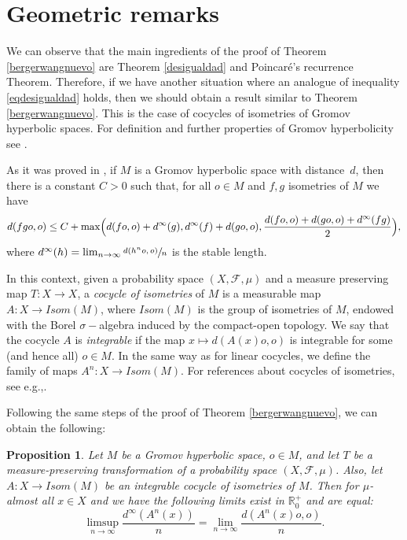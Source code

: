 \documentclass[11pt]{article}
\newcommand{\eg}{e.g.,\xspace}
\let\mathcal\mathscr
\theoremstyle{plain}
\newtheorem{prop}[teo]{Proposition}
\theoremstyle{definition}
\newcommand{\RR}{\mathbb{R}}
\newcommand{\Isom}{\mathit{Isom}}
\newcommand{\ccl}[3]{#1^{#2}(#3)}
\begin{document}
\section{Geometric remarks}\label{seccionseis}

We can observe that the main ingredients of the proof of Theorem \ref{bergerwangnuevo} are Theorem \ref{desigualdad} and Poincaré's recurrence Theorem. Therefore, if we have another situation where an analogue of inequality \eqref{eqdesigualdad} holds, then we should obtain a result similar to Theorem \ref{bergerwangnuevo}. This is the case of cocycles of isometries of Gromov hyperbolic spaces. For definition and further properties of Gromov hyperbolicity see \cite{bri,papa,geodyn}.

As it was proved in \cite[Th.\,1.2]{yo}, if $M$ is a Gromov hyperbolic space with distance~$d$, then there is a constant $C>0$ such that, for all $o\in M$ and $f,g$ isometries of $M$ we have
\begin{equation*}
d(fgo,o)\leq C+\max \Bigl(d(fo,o)+d^{\infty}(g),d^{\infty}(f)+d(go,o),\frac{d(fo,o)+d(go,o)+d^{\infty}(fg)}{2}\Bigr),
\end{equation*}
where $d^{\infty}(h)=\lim_{n\to \infty}\sfrac{d(h^{n}o,o)}{n}$ is the stable length.

In this context, given a probability space $(X,\mathcal{F},\mu)$ and a measure preserving map $T:X\rightarrow X$, a \textit{cocycle of isometries} of $M$ is a measurable map $A:X\rightarrow \Isom(M)$, where $\Isom(M)$ is the group of isometries of $M$, endowed with the Borel $\sigma-$algebra induced by the compact-open topology. We say that the cocycle $A$ is \textit{integrable} if the map $x\mapsto d(A(x)o,o)$ is integrable for some (and hence all) $o \in M$. In the same way as for linear cocycles, we define the family of maps $A^{n}:X\rightarrow \Isom(M)$. For references about cocycles of isometries, see \eg \cite{goukar,karmar}.

Following the same steps of the proof of Theorem \ref{bergerwangnuevo}, we can obtain the following:

\begin{prop}\label{bewagromov}Let $M$ be a Gromov hyperbolic space, $o\in M$, and let $T$ be a measure-preserving transformation of a probability space $(X,\mathcal{F},\mu)$. Also, let $A: X \rightarrow \Isom(M)$ be an integrable cocycle of isometries of $M$. Then for $\mu$-almost all $x\in X$ and we have the following limits exist in $\RR^{+}_{0}$ and are equal:\vspace*{-3pt}\enlargethispage{\baselineskip}%
\begin{equation*}
\limsup_{n\to \infty}{\frac{d^{\infty}(\ccl{A}{n}{x})}{n}}=\lim_{n \to \infty}{\frac{d(\ccl{A}{n}{x}o,o)}{n}}.
\end{equation*}
\end{prop}
\end{document}

